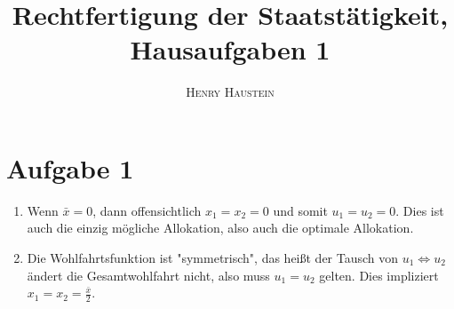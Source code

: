 \documentclass{article}
\title{\textbf{Rechtfertigung der Staatstätigkeit, Hausaufgaben 1}}
\author{\textsc{Henry Haustein}}
\date{}
\begin{document}
	\maketitle
	
	\section*{Aufgabe 1}
	\begin{enumerate}[label=(\alph*)]
		\item Wenn $\bar{x}=0$, dann offensichtlich $x_1=x_2=0$ und somit $u_1=u_2=0$. Dies ist auch die einzig mögliche Allokation, also auch die optimale Allokation.
		\item Die Wohlfahrtsfunktion ist "symmetrisch", das heißt der Tausch von $u_1 \Leftrightarrow u_2$ ändert die Gesamtwohlfahrt nicht, also muss $u_1=u_2$ gelten. Dies impliziert $x_1=x_2=\frac{\bar{x}}{2}$.
	\end{enumerate}
\end{document}

